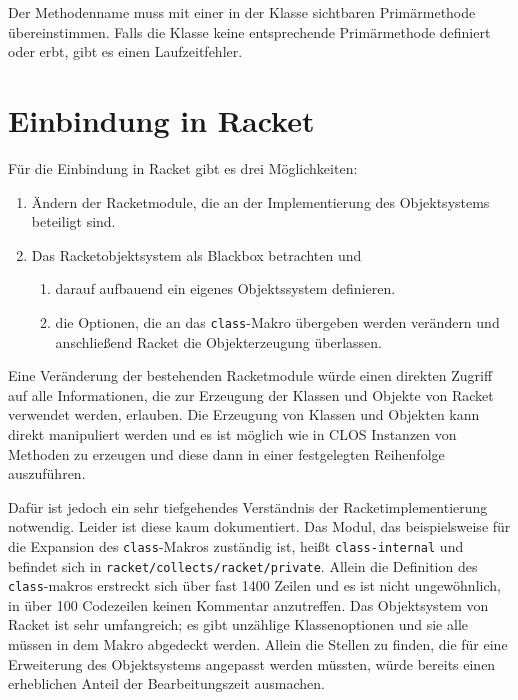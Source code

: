 Der Methodenname muss mit einer in der Klasse sichtbaren Primärmethode übereinstimmen. Falls die Klasse keine entsprechende Primärmethode definiert oder erbt, gibt es einen Laufzeitfehler.

\section{Einbindung in Racket}
Für die Einbindung in Racket gibt es drei Möglichkeiten:
\begin{enumerate}
 \item Ändern der Racketmodule, die an der Implementierung des Objektsystems beteiligt sind.
 \item Das Racketobjektsystem als Blackbox betrachten und 
 \begin{enumerate} \vspace{-0.3cm}
  \item darauf aufbauend ein eigenes Objektssystem definieren. \vspace{-0.3cm}
  \item die Optionen, die an das \texttt{class}-Makro übergeben werden verändern und anschließend Racket die Objekterzeugung überlassen.
 \end{enumerate}
\end{enumerate}

Eine Veränderung der bestehenden Racketmodule würde einen direkten Zugriff auf alle Informationen, die zur Erzeugung der Klassen und Objekte von Racket verwendet werden, erlauben. Die Erzeugung von Klassen und Objekten kann direkt manipuliert werden und es ist möglich wie in CLOS Instanzen von Methoden zu erzeugen und diese dann in einer festgelegten Reihenfolge auszuführen. 

Dafür ist jedoch ein sehr tiefgehendes Verständnis der Racketimplementierung notwendig. Leider ist diese kaum dokumentiert. Das Modul, das beispielsweise für die Expansion des \texttt{class}-Makros zuständig ist, heißt \texttt{class-internal} und befindet sich in \texttt{racket/collects/racket/private}. Allein die Definition des \texttt{class}-makros erstreckt sich über fast 1400 Zeilen und es ist nicht ungewöhnlich, in über 100 Codezeilen keinen Kommentar anzutreffen. Das Objektsystem von Racket ist sehr umfangreich; es gibt unzählige Klassenoptionen und sie alle müssen in dem Makro abgedeckt werden. Allein die Stellen zu finden, die für eine Erweiterung des Objektsystems angepasst werden müssten, würde bereits einen erheblichen Anteil der Bearbeitungszeit ausmachen.

